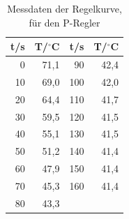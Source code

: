 \documentclass[12pt,a4paper]{article}
\begin{document}
\begin{table}[htbp]
\centering
\begin{tabular}{||r|r||r|r||}

t/s & T/$^\circ$C & t/s & T/$^\circ$C \\ \hline
0 & 71,1 & 90 & 42,4 \\ 
10 & 69,0 & 100 & 42,0 \\ 
20 & 64,4 & 110 & 41,7 \\ 
30 & 59,5 & 120 & 41,5 \\ 
40 & 55,1 & 130 & 41,5 \\ 
50 & 51,2 & 140 & 41,4 \\ 
60 & 47,9 & 150 & 41,4 \\ 
70 & 45,3 & 160 & 41,4 \\ 
80 & 43,3 & \multicolumn{1}{l}{} & \multicolumn{1}{l}{} \\ 
\end{tabular}
\caption{Messdaten der Regelkurve, für den P-Regler}
\label{tab:3_3}
\end{table}
\end{document}
